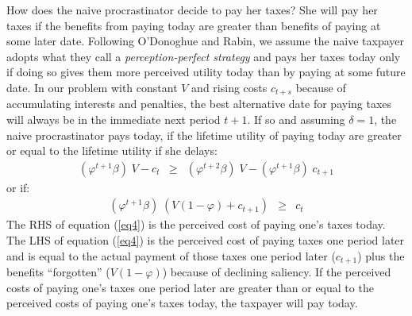\documentclass[12pt]{article}
\begin{document}
How does the naive procrastinator decide to pay her taxes?  She will
pay her taxes if the benefits from paying today are greater than
benefits of paying at some later date.  Following O'Donoghue and
Rabin, we assume the naive taxpayer adopts what they call a
\textit{perception-perfect strategy} and pays her taxes today only if
doing so gives them more perceived utility today than by paying at
some future date.  In our problem with constant $V$ and rising costs
$c_{t+s}$ because of accumulating interests and penalties, the best
alternative date for paying taxes will always be in the immediate next
period $ t + 1$.  If so and assuming $\delta=1$, the naive
procrastinator pays today, if the lifetime utility of paying today are
greater or equal to the lifetime utility if she delays:
\begin{eqnarray}\label{eq3}
(\varphi^{t+1} \beta) \; V - c_ t &\ge& (\varphi^{t+2} \beta) \; V -
  (\varphi^{t+1} \beta) \; c_ {t+1}
\end{eqnarray}
or if: 
\begin{eqnarray}\label{eq4}
(\varphi^{t+1} \beta) \; (V (1-\varphi) + c_{t+1}) &\ge& c_ {t}
\end{eqnarray}
The RHS of equation (\ref{eq4}) is the perceived cost of paying one's
taxes today.  The LHS of equation (\ref{eq4}) is the perceived cost of
paying taxes one period later and is equal to the actual payment of
those taxes one period later ($c_{t+1}$) plus the benefits
``forgotten'' ($V(1 - \varphi)$) because of declining saliency.  If
the perceived costs of paying one's taxes one period later are greater
than or equal to the perceived costs of paying one's taxes today, the
taxpayer will pay today.
\end{document}
